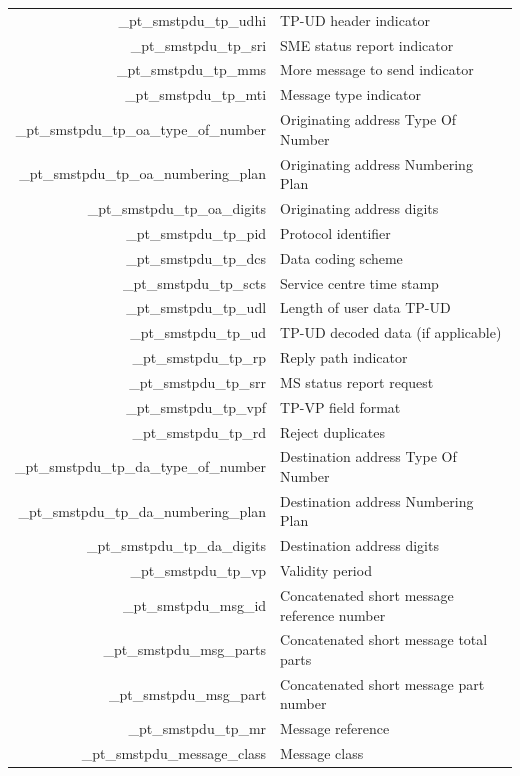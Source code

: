 \documentclass[a4paper,latin]{paper}
\begin{document}
\begin{tabularx}{\linewidth}{ | >{\ttfamily} r | >{\ttfamily} X |}
	\multicolumn{2}{| l |}{\acrfull{smstpdu}}		\\
	\hline
	\_pt\_smstpdu\_tp\_udhi					& TP-UD header indicator \\
	\_pt\_smstpdu\_tp\_sri					& SME status report indicator \\
	\_pt\_smstpdu\_tp\_mms					& More message to send indicator \\
	\_pt\_smstpdu\_tp\_mti					& Message type indicator \\
	\_pt\_smstpdu\_tp\_oa\_type\_of\_number			& Originating address Type Of Number \\
	\_pt\_smstpdu\_tp\_oa\_numbering\_plan			& Originating address Numbering Plan \\
	\_pt\_smstpdu\_tp\_oa\_digits				& Originating address digits \\
	\_pt\_smstpdu\_tp\_pid					& Protocol identifier \\
	\_pt\_smstpdu\_tp\_dcs					& Data coding scheme \\
	\_pt\_smstpdu\_tp\_scts					& Service centre time stamp \\
	\_pt\_smstpdu\_tp\_udl					& Length of user data TP-UD \\
	\_pt\_smstpdu\_tp\_ud					& TP-UD decoded data (if applicable)\\
	\_pt\_smstpdu\_tp\_rp					& Reply path indicator \\
	\_pt\_smstpdu\_tp\_srr					& MS status report request \\
	\_pt\_smstpdu\_tp\_vpf					& TP-VP field format \\
	\_pt\_smstpdu\_tp\_rd					& Reject duplicates \\
	\_pt\_smstpdu\_tp\_da\_type\_of\_number			& Destination address Type Of Number \\
	\_pt\_smstpdu\_tp\_da\_numbering\_plan			& Destination address Numbering Plan \\
	\_pt\_smstpdu\_tp\_da\_digits				& Destination address digits \\
	\_pt\_smstpdu\_tp\_vp					& Validity period \\
	\_pt\_smstpdu\_msg\_id					& Concatenated short message reference number \\
	\_pt\_smstpdu\_msg\_parts				& Concatenated short message total parts \\
	\_pt\_smstpdu\_msg\_part				& Concatenated short message part number \\
	\_pt\_smstpdu\_tp\_mr					& Message reference \\
	\_pt\_smstpdu\_message\_class				& Message class \\
	\hline
\end{tabularx}%
\clearpage
\end{document}

